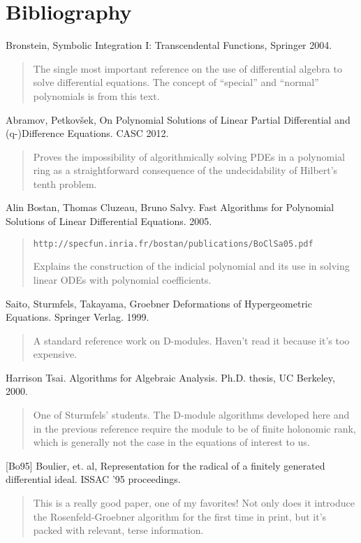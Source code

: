 \documentclass{article}
\begin{document}
\vfill\eject

\section*{Bibliography}

Bronstein, Symbolic Integration I: Transcendental Functions, Springer 2004.

\begin{quote}
The single most important reference on the use of differential
algebra to solve differential equations.  The concept of
``special'' and ``normal'' polynomials is from this text.
\end{quote}

Abramov, Petkov\v sek,
On Polynomial Solutions of Linear Partial
Differential and (q-)Difference Equations.  CASC 2012.

\begin{quote}
Proves the impossibility of algorithmically solving PDEs in a polynomial
ring as a straightforward consequence of the undecidability
of Hilbert's tenth problem.
\end{quote}

Alin Bostan, Thomas Cluzeau, Bruno Salvy.
Fast Algorithms for Polynomial Solutions
of Linear Differential Equations. 2005.

\begin{quote}
{\tt http://specfun.inria.fr/bostan/publications/BoClSa05.pdf}

Explains the construction of the indicial polynomial and its
use in solving linear ODEs with polynomial coefficients.
\end{quote}

Saito, Sturmfels, Takayama, Groebner Deformations of Hypergeometric Equations.
Springer Verlag. 1999.

\begin{quote}
A standard reference work on D-modules.  Haven't read it because it's
too expensive.
\end{quote}

Harrison Tsai.  Algorithms for Algebraic Analysis.  Ph.D. thesis, UC Berkeley, 2000.

\begin{quote}
One of Sturmfels' students.  The D-module algorithms developed here
and in the previous reference require the module to be of finite
holonomic rank, which is generally not the case in the equations
of interest to us.
\end{quote}

[Bo95] Boulier, et. al, Representation for the radical of a finitely
generated differential ideal.  ISSAC '95 proceedings.

\begin{quote}
This is a really good paper, one of my favorites!  Not only does it
introduce the Rosenfeld-Groebner algorithm for the first time in
print, but it's packed with relevant, terse information.
\end{quote}
\end{document}
